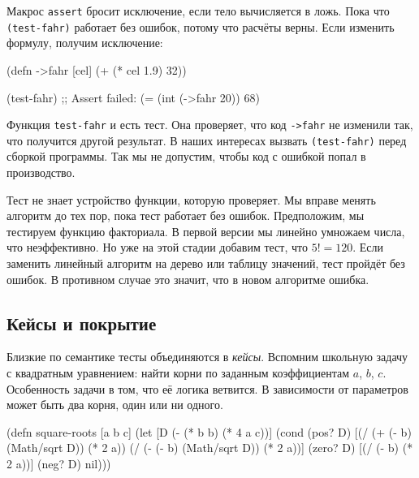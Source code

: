 Макрос \verb|assert| бросит исключение, если тело вычисляется в ложь. Пока что
\verb|(test-fahr)| работает без ошибок, потому что расчёты верны. Если изменить
формулу, получим исключение:

\begin{english}
  \begin{clojure}
(defn ->fahr [cel]
  (+ (* cel 1.9) 32))

(test-fahr)
;; Assert failed: (= (int (->fahr 20)) 68)
  \end{clojure}
\end{english}

Функция \verb|test-fahr| и есть тест. Она проверяет, что код \verb|->fahr|
не изменили так, что получится другой результат. В наших интересах вызвать
\verb|(test-fahr)| перед сборкой программы. Так мы не допустим, чтобы код с
ошибкой попал в производство.


Тест не знает устройство функции, которую проверяет. Мы вправе менять алгоритм
до тех пор, пока тест работает без ошибок. Предположим, мы тестируем функцию
факториала. В первой версии мы линейно умножаем числа, что неэффективно. Но уже
на этой стадии добавим тест, что $5! = 120$. Если заменить линейный алгоритм на
дерево или таблицу значений, тест пройдёт без ошибок. В противном случае это
значит, что в новом алгоритме ошибка.

\subsection{Кейсы и покрытие}


Близкие по семантике тесты объединяются в \emph{кейсы}. Вспомним школьную задачу
с квадратным уравнением: найти корни по заданным коэффициентам $a$, $b$,
$c$. Особенность задачи в том, что её логика ветвится. В зависимости от
параметров может быть два корня, один или ни одного.


\begin{english}
  \begin{clojure}
(defn square-roots [a b c]
  (let [D (- (* b b) (* 4 a c))]
    (cond
      (pos? D) [(/ (+ (- b) (Math/sqrt D)) (* 2 a))
                (/ (- (- b) (Math/sqrt D)) (* 2 a))]
      (zero? D) [(/ (- b) (* 2 a))]
      (neg? D) nil)))
  \end{clojure}
\end{english}

